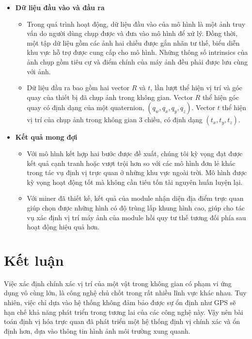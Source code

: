 \begin{itemize}
  \item \textbf{Dữ liệu đầu vào và đầu ra}
        \begin{itemize}
          \item Trong quá trình hoạt động, dữ liệu đầu vào của mô hình là một ảnh truy vấn do người dùng chụp được và đưa vào mô hình để xử lý. Đồng thời, một tập dữ liệu gồm các ảnh hai chiều được gắn nhãn tư thế, biểu diễn khu vực hỗ trợ được cung cấp cho mô hình. Những thông số intrinsics của ảnh chụp gồm tiêu cự và điểm chính của máy ảnh đều phải được lưu cùng với ảnh.
          \item Dữ liệu đầu ra bao gồm hai vector $R$ và $t$, lần lượt thể hiện vị trí và góc quay của thiết bị đã chụp ảnh trong không gian. Vector $R$ thể hiện góc quay có định dạng của một quaternion, $(q_w,q_x,q_y,q_z)$. Vector $t$ thể hiện vị trí của chụp ảnh trong không gian 3 chiều, có định dạng $(t_x,t_y,t_z)$.
        \end{itemize}
  \item \textbf{Kết quả mong đợi}
        \begin{itemize}
          \item Với mô hình kết hợp hai bước được đề xuất, chúng tôi kỳ vọng đạt được kết quả cạnh tranh hoặc vượt trội hơn so với các mô hình đơn lẻ khác trong tác vụ định vị trực quan ở những khu vực ngoài trời. Mô hình được kỳ vọng hoạt động tốt mà không cần tiêu tốn tài nguyên huấn luyện lại.
          \item Với miner đã thiết kế, kết quả của module nhận diện địa điểm trực quan giúp chọn được những hình có độ trùng lấp khung hình cao, giúp cho tác vụ xác định vị trí máy ảnh của module hồi quy tư thế tương đối phía sau hoạt động hiệu quả hơn.
        \end{itemize}
\end{itemize}

\section{Kết luận}
Việc xác định chính xác vị trí của một vật trong không gian có phạm vi ứng dụng vô cùng lớn, là công nghệ chủ chốt trong rất nhiều lĩnh vực khác nhau. Tuy nhiên, việc chỉ dựa vào hệ thống không đảm bảo được sự ổn định như GPS sẽ hạn chế khả năng phát triển trong tương lai của các công nghệ này. Vậy nên bài toán định vị hóa trực quan đã phát triển một hệ thống định vị chính xác và ổn định hơn, dựa vào thông tin hình ảnh môi trường xung quanh.

